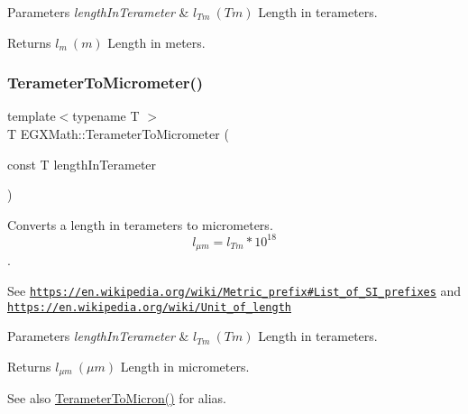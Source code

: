 \begin{DoxyParams}{Parameters}
{\em length\+In\+Terameter} & $ l_{Tm}\ (Tm)$ Length in terameters. \\
\hline
\end{DoxyParams}
\begin{DoxyReturn}{Returns}
$ l_{m}\ (m)$ Length in meters. 
\end{DoxyReturn}
\mbox{\label{group___e_g_x_math-_conversions-_length_conversions-_terameter-_s_i_ga4f6fb943e4c16178f4060c01a9c00a02}} 
\subsubsection{\texorpdfstring{Terameter\+To\+Micrometer()}{TerameterToMicrometer()}}
{\footnotesize\ttfamily template$<$typename T $>$ \\
T E\+G\+X\+Math\+::\+Terameter\+To\+Micrometer (\begin{DoxyParamCaption}\item[{const T}]{length\+In\+Terameter }\end{DoxyParamCaption})}



Converts a length in terameters to micrometers. \[ l_{\mu m}=l_{Tm} * 10^{18} \]. 

See \href{https://en.wikipedia.org/wiki/Metric_prefix#List_of_SI_prefixes}{\tt https\+://en.\+wikipedia.\+org/wiki/\+Metric\+\_\+prefix\#\+List\+\_\+of\+\_\+\+S\+I\+\_\+prefixes} and \href{https://en.wikipedia.org/wiki/Unit_of_length}{\tt https\+://en.\+wikipedia.\+org/wiki/\+Unit\+\_\+of\+\_\+length} 
\begin{DoxyParams}{Parameters}
{\em length\+In\+Terameter} & $ l_{Tm}\ (Tm)$ Length in terameters. \\
\hline
\end{DoxyParams}
\begin{DoxyReturn}{Returns}
$ l_{\mu m}\ (\mu m)$ Length in micrometers. 
\end{DoxyReturn}
\begin{DoxySeeAlso}{See also}
\mbox{\hyperlink{group___e_g_x_math-_conversions-_length_conversions-_terameter-_non-_s_i_gaa5fdc4aaf15e6428cf443e3d808403a3}{Terameter\+To\+Micron()}} for alias. 
\end{DoxySeeAlso}
\mbox{\label{group___e_g_x_math-_conversions-_length_conversions-_terameter-_s_i_gaff9d9c2af8681eacbb3d5d01cb9f9cfa}} 
